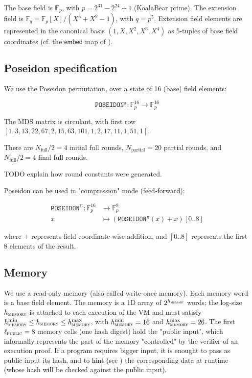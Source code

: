 \documentclass{article}
\theoremstyle{definition}
\newcommand{\Fp}{\mathbb F_p}
\newcommand{\Fq}{\mathbb F_q}
\begin{document}
The base field is $\Fp$, with $p = 2^{31} - 2^{24} + 1$ (KoalaBear prime). The extension field is $\Fq = \Fp[X] / (X^5 + X^2 - 1)$, with $q = p^5$. Extension field elements are represented in the canonical basis $(1, X, X^2, X^3, X^4)$ as 5-tuples of base field coordinates (cf. the $\mathsf{embed}$ map of ).


\subsection{Poseidon specification}

We use the Poseidon \cite{poseidon1} permutation, over a state of 16 (base) field elements: 

$$\texttt{POSEIDON}^\pi: \Fp^{16} \to \Fp^{16}$$

The MDS matrix is circulant, with first row $[1, 3, 13, 22, 67, 2, 15, 63, 101, 1, 2, 17, 11, 1, 51, 1]$.

There are $N_\text{full} / 2 = 4$ initial full rounds, $N_\text{partial} = 20$ partial rounds, and $N_\text{full} / 2 = 4$ final full rounds.

TODO explain how round constants were generated.

\vspace{3mm}

Poseidon can be used in "compression" mode (feed-forward):

\begin{align*}
\texttt{POSEIDON}^C: \Fp^{16} &\to \Fp^{8} \\
x &\mapsto (\texttt{POSEIDON}^\pi(x) + x)[0..8]
\end{align*}

where $+$ represents field coordinate-wise addition, and $[0..8]$ represents the first 8 elements of the result.


\subsection{Memory}\label{sec:memory}

We use a read-only memory (also called write-once memory). Each memory word is a base field element. The memory is a 1D array of $2^{h_\textsc{memory}}$ words; the log-size $h_\textsc{memory}$ is attached to each execution of the VM and must satisfy $h_\textsc{memory}^{\min} \leq h_\textsc{memory} \leq h_\textsc{memory}^{\max}$, with $h_\textsc{memory}^{\min} = 16$ and $h_\textsc{memory}^{\max} = 26$. The first $\ell_\textsc{public} = 8$ memory cells (one hash digest) hold the "public input", which informally represents the part of the memory "controlled" by the verifier of an execution proof. If a program requires bigger input, it is enought to pass as public input its hash, and to hint (see ) the corresponding data at runtime (whose hash will be checked against the public input).
\end{document}
